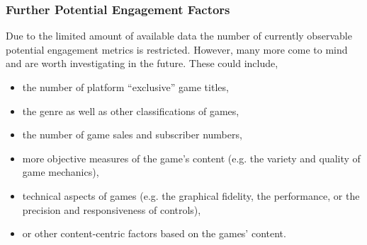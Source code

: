 \subsubsection{Further Potential Engagement Factors}

Due to the limited amount of available data the number of currently observable potential engagement metrics is restricted. However, many more come to mind and are worth investigating in the future. These could include,

\begin{itemize}
	\item the number of platform ``exclusive'' game titles,
	\item the genre as well as other classifications of games,
	\item the number of game sales and subscriber numbers,
	\item more objective measures of the game's content (e.g. the variety and quality of game mechanics),
	\item technical aspects of games (e.g. the graphical fidelity, the performance, or the precision and responsiveness of controls),
	\item or other content-centric factors based on the games' content.
\end{itemize}





%



